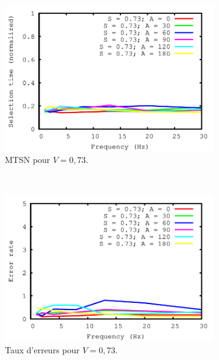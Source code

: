 	\begin{figure}[!htb]
		\centering
		\begin{subfigure}[t]{\subImgWlineplot}
			\centering
			\includegraphics[width=\textwidth]{figures/ch4/frequency_speed_0_73_times}
			\caption{MTSN pour $V = 0,73$.}
			\label{fig:fEffect_t_073}
		\end{subfigure}
		~
		\begin{subfigure}[t]{\subImgWlineplot}
			\centering
			\includegraphics[width=\textwidth]{figures/ch4/frequency_speed_0_73_errors}
			\caption{Taux d'erreurs pour $V = 0,73$.}
			\label{fig:fEffect_e_073}
		\end{subfigure}
		~
		\begin{subfigure}[t]{\subImgWlineplot}
			\centering

\end{subfigure}
\end{figure}
